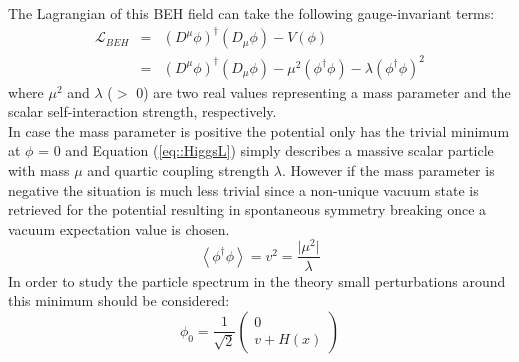 The Lagrangian of this BEH field can take the following gauge-invariant terms:
\begin{eqnarray} \label{eq::HiggsL}
 \mathcal{L}_{BEH} & = & (D^{\mu} \phi)^{\dagger}(D_{\mu} \phi) - V(\phi) \nonumber \\
                   & = & (D^{\mu} \phi)^{\dagger}(D_{\mu} \phi) - \mu^{2} (\phi^{\dagger} \phi) - \lambda (\phi^{\dagger} \phi)^{2}
\end{eqnarray}
where $\mu^{2}$ and $\lambda$ ($>$ 0) are two real values representing a mass parameter and the scalar self-interaction strength, respectively.
\\
In case the mass parameter is positive the potential only has the trivial minimum at $\phi$ = 0 and Equation (\ref{eq::HiggsL}) simply describes a massive scalar particle with mass $\mu$ and quartic coupling strength $\lambda$. However if the mass parameter is negative the situation is much less trivial since a non-unique vacuum state is retrieved for the potential resulting in spontaneous symmetry breaking once a vacuum expectation value is chosen.
\begin{equation}
 \left< \phi^{\dagger} \phi \right> = v^{2} = \frac{\vert \mu^{2} \vert}{\lambda} %
\end{equation}
In order to study the particle spectrum in the theory small perturbations around this minimum should be considered:
\begin{equation}
 \phi_{0} = \frac{1}{\sqrt{2}}\begin{pmatrix}
             0 \\
             v + H(x)
            \end{pmatrix}
\end{equation}
